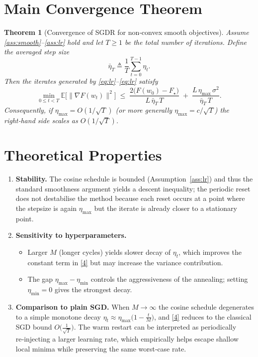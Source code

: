 \documentclass{article}
\newtheorem{theorem}{Theorem}
\newcommand{\EE}{\mathbb{E}}
\begin{document}
\section*{Main Convergence Theorem}
\begin{theorem}[Convergence of SGDR for non‑convex smooth objectives]\label{thm:sgdr}
Assume \ref{ass:smooth}–\ref{ass:lr} hold and let $T\ge1$ be the total number of
iterations. Define the averaged step size
\[
\bar\eta_T\triangleq \frac{1}{T}\sum_{t=0}^{T-1}\eta_t .
\]
Then the iterates generated by \eqref{eq:lr}–\eqref{eq:lr} satisfy
\[
\min_{0\le t<T}\EE\bigl[\|\nabla F(w_t)\|^2\bigr]
\;\le\;
\frac{2\bigl(F(w_0)-F_\star\bigr)}{L\,\bar\eta_T\,T}
\;+\;
\frac{L\,\eta_{\max}\,\sigma^2}{\bar\eta_T\,T}.
\tag{4}
\]
Consequently, if $\eta_{\max}=O(1/\sqrt{T})$ (or more generally $\eta_{\max}=c/\sqrt{T}$)
the right‑hand side scales as $O(1/\sqrt{T})$.
\end{theorem}

\section*{Theoretical Properties}
\begin{enumerate}[label=\arabic*.]
\item \textbf{Stability.} The cosine schedule is bounded (Assumption~\ref{ass:lr}) and thus the standard smoothness argument yields a descent inequality; the periodic reset does not destabilise the method because each reset occurs at a point where the stepsize is again $\eta_{\max}$ but the iterate is already closer to a stationary point.

\item \textbf{Sensitivity to hyperparameters.}
    \begin{itemize}
        \item Larger $M$ (longer cycles) yields slower decay of $\eta_t$, which improves
              the constant term in \eqref{4} but may increase the variance contribution.
        \item The gap $\eta_{\max}-\eta_{\min}$ controls the aggressiveness of the
              annealing; setting $\eta_{\min}=0$ gives the strongest decay.
    \end{itemize}

\item \textbf{Comparison to plain SGD.} When $M\to\infty$ the cosine schedule
degenerates to a simple monotone decay $\eta_t\approx\eta_{\max}\bigl(1-\tfrac{t}{M}\bigr)$,
and \eqref{4} reduces to the classical SGD bound
$O\bigl(\tfrac{1}{\sqrt{T}}\bigr)$. The warm restart can be interpreted as
periodically re‑injecting a larger learning rate, which empirically helps escape
shallow local minima while preserving the same worst‑case rate.

\end{enumerate}
\end{document}
